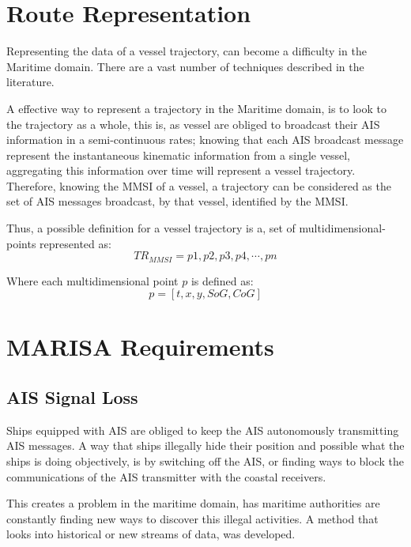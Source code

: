 \section{Route Representation}
Representing the data of a vessel trajectory, can become a difficulty in the Maritime domain. There are a vast number of techniques described in the literature.

A effective way to represent a trajectory in the Maritime domain, is to look to the trajectory as a whole, this is, as vessel are obliged to broadcast their AIS information in a semi-continuous rates; knowing that each AIS broadcast message represent the instantaneous kinematic information from a single vessel, aggregating this information over time will represent a vessel trajectory. Therefore, knowing the MMSI of a vessel, a trajectory can be considered as the set of AIS messages broadcast, by that vessel, identified by the MMSI.


Thus, a possible definition for a vessel trajectory is a, set of multidimensional-points represented as:
\[TR_{MMSI} = p1, p2, p3, p4, \cdots , pn\]

Where each multidimensional point $p$ is defined as:
\[p = [t, x, y, SoG, CoG]\]





\section{MARISA Requirements}
\subsection{AIS Signal Loss}
Ships equipped with AIS are obliged to keep the AIS autonomously transmitting AIS messages. A way that ships illegally hide their position and possible what the ships is doing objectively, is by switching off the AIS, or finding ways to block the communications of the AIS transmitter with the coastal receivers.

This creates a problem in the maritime domain, has maritime authorities are constantly finding new ways to discover this illegal activities. A method that looks into historical or new streams of data, was developed. 

